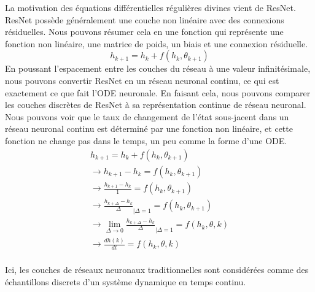  La motivation des équations différentielles régulières divines vient de ResNet. ResNet possède généralement une couche non linéaire avec des connexions résiduelles. Nous pouvons résumer cela en une fonction qui représente une fonction non linéaire, une matrice de poids, un biais et une connexion résiduelle.
 \begin{equation}
    h_{k+1} = h_k + f(h_k, \theta_{k+1})
\end{equation}
 En poussant l'espacement entre les couches du réseau à une valeur infinitésimale, nous pouvons convertir ResNet en un réseau neuronal continu, ce qui est exactement ce que fait l'ODE neuronale. En faisant cela, nous pouvons comparer les couches discrètes de ResNet à sa représentation continue de réseau neuronal. Nous pouvons voir que le taux de changement de l’état sous-jacent dans un réseau neuronal continu est déterminé par une fonction non linéaire, et cette fonction ne change pas dans le temps, un peu comme la forme d’une ODE.
 \begin{align*}
 h_{k+1} = h_k + f(h_k, \theta_{k+1}) \\
 \to  h_{k+1} - h_k = f(h_k, \theta_{k+1}) \\
 \to \frac{h_{k+1} - h_k}{1} = f(h_k, \theta_{k+1}) \\
 \to \frac{h_{k+\Delta} - h_k}{\Delta}_{|\Delta=1} = f(h_k, \theta_{k+1}) \\
 \to \lim_{\Delta \to 0} \frac{h_{k+\Delta} - h_k}{\Delta}_{|\Delta=1} = f(h_k, \theta, k) \\
\to \frac{dh(k)}{dt} = f(h_k, \theta, k) \\
\end{align*}

Ici, les couches de réseaux neuronaux traditionnelles sont considérées comme des échantillons discrets d'un système dynamique en temps continu.


